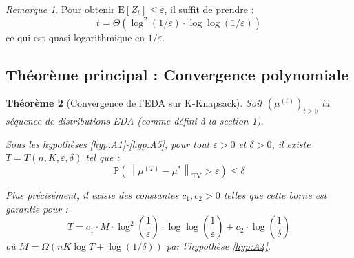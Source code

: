 \documentclass[12pt,a4paper]{article}
\newtheorem{theorem}{Théorème}[section]
\theoremstyle{definition}
\theoremstyle{remark}
\newtheorem{remark}[theorem]{Remarque}
\newcommand{\E}{\text{E}}
\newcommand{\Prob}{\mathbb{P}}
\newcommand{\TV}{\text{TV}}
\newcommand{\norm}[1]{\left\|#1\right\|}
\begin{document}
	\begin{remark}
		Pour obtenir $\E[Z_t] \leq \varepsilon$, il suffit de prendre :
		\begin{equation}
			t = \Theta\left(\log^2(1/\varepsilon) \cdot \log\log(1/\varepsilon)\right)
		\end{equation}
		ce qui est quasi-logarithmique en $1/\varepsilon$.
	\end{remark}
	
	\subsection{Théorème principal : Convergence polynomiale}
	
	\begin{theorem}[Convergence de l'EDA sur K-Knapsack]\label{thm:main}
		Soit $(\mu^{(t)})_{t\geq 0}$ la séquence de distributions EDA (comme défini à la section 1).
		
		Sous les hypothèses \ref{hyp:A1}-\ref{hyp:A5}, pour tout $\varepsilon > 0$ et $\delta > 0$, il existe $T = T(n, K, \varepsilon, \delta)$ tel que :
		\begin{equation}
			\Prob\left(\norm{\mu^{(T)} - \mu^*}_{\TV} > \varepsilon\right) \leq \delta
		\end{equation}
		
		Plus précisément, il existe des constantes $c_1, c_2 > 0$ telles que cette borne est garantie pour :
		\begin{equation}
			T = c_1 \cdot M \cdot \log^2\left(\frac{1}{\varepsilon}\right) \cdot \log\log\left(\frac{1}{\varepsilon}\right) + c_2 \cdot \log\left(\frac{1}{\delta}\right)
		\end{equation}
		où $M = \Omega(nK \log T + \log(1/\delta))$ par l'hypothèse \ref{hyp:A4}.
	\end{theorem}
	
\end{document}
